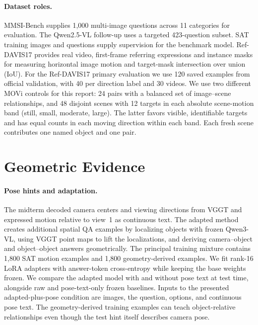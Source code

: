 \documentclass[10pt,letterpaper]{article}
\begin{document}
\paragraph{Dataset roles.}
MMSI-Bench supplies 1,000 multi-image questions across 11 categories for evaluation. The Qwen2.5-VL follow-up uses a targeted 423-question subset. SAT training images and questions supply supervision for the benchmark model. Ref-DAVIS17 provides real video, first-frame referring expressions and instance masks for measuring horizontal image motion and target-mask intersection over union (IoU). For the Ref-DAVIS17 primary evaluation we use 120 saved examples from official validation, with 40 per direction label and 30 videos. We use two different MOVi controls for this report: 24 pairs with a balanced set of image--scene relationships, and 48 disjoint scenes with 12 targets in each absolute scene-motion band (still, small, moderate, large). The latter favors visible, identifiable targets and has equal counts in each moving direction within each band. Each fresh scene contributes one named object and one pair.

\section{Geometric Evidence}
\paragraph{Pose hints and adaptation.}
The midterm decoded camera centers and viewing directions from VGGT and expressed motion relative to view~1 as continuous text. The adapted method creates additional spatial QA examples by localizing objects with frozen Qwen3-VL, using VGGT point maps to lift the localizations, and deriving camera--object and object--object answers geometrically. The principal training mixture contains 1,800 SAT motion examples and 1,800 geometry-derived examples. We fit rank-16 LoRA adapters with answer-token cross-entropy while keeping the base weights frozen. We compare the adapted model with and without pose text at test time, alongside raw and pose-text-only frozen baselines. Inputs to the presented adapted-plus-pose condition are images, the question, options, and continuous pose text. The geometry-derived training examples can teach object-relative relationships even though the test hint itself describes camera pose.
\end{document}
